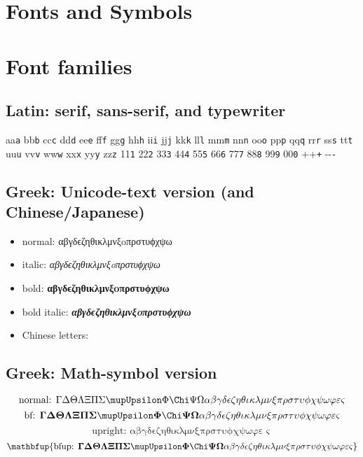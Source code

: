 \documentclass[11pt,pdf0]{MishoNote}
\begin{document}
\section{Fonts and Symbols}

\section{Font families}
\subsection{Latin: serif, sans-serif, and typewriter}

\def\w#1{#1\textsf{#1}\texttt{#1} }
\w a\w b\w c\w d\w e\w f\w g\w h\w i\w j\w k\w l\w m\w n\w o\w p\w q\w r\w s\w t\w u\w v\w w\w x\w y\w z\w 1\w 2\w 3\w 4\w 5\w 6\w 7\w 8\w 9\w0 \w+\w-

\subsection{Greek: Unicode-text version (and Chinese/Japanese)}
\begin{itemize}
  \item normal: αβγδϵζηθικλμνξoπρστυϕχψω
  \item italic: \textit{αβγδϵζηθικλμνξoπρστυϕχψω}
  \item bold: \textbf{αβγδϵζηθικλμνξoπρστυϕχψω}
  \item bold italic: \textbf{\textit{αβγδϵζηθικλμνξoπρστυϕχψω}}
  \item Chinese letters: \endjapanese
\end{itemize}

\subsection{Greek: Math-symbol version}
\[
  \text{normal: }\Gamma \Delta \Theta \Lambda \Xi \Pi \Sigma \Upsilon \Phi \Chi \Psi \Omega
  \alpha \beta \gamma \delta \epsilon \zeta \eta \theta \iota \kappa \lambda \mu \nu \xi \pi \rho \sigma \tau \upsilon \phi \chi \psi \omega
  \varphi\varepsilon\varsigma
\]
\[\mathbf{
  \text{bf: }
  \Gamma \Delta \Theta \Lambda \Xi \Pi \Sigma \Upsilon \Phi \Chi \Psi \Omega
  \alpha \beta \gamma \delta \epsilon \zeta \eta \theta \iota \kappa \lambda \mu \nu \xi \pi \rho \sigma \tau \upsilon \phi \chi \psi \omega
  \varphi\varepsilon\varsigma
}\]
\[\mathup{
  \text{upright: }
  \alpha \beta \gamma \delta \epsilon \zeta \eta \theta \iota \kappa \lambda \mu \nu \xi \pi \rho \sigma \tau \upsilon \phi \chi \psi \omega
  \varphi\varepsilon\varsigma
}\]
\[\mathbf{\mathbfup{
  \text{bfup: }
  \Gamma \Delta \Theta \Lambda \Xi \Pi \Sigma \Upsilon \Phi \Chi \Psi \Omega
  \alpha \beta \gamma \delta \epsilon \zeta \eta \theta \iota \kappa \lambda \mu \nu \xi \pi \rho \sigma \tau \upsilon \phi \chi \psi \omega
  \varphi\varepsilon\varsigma
}}\]
\end{document}
